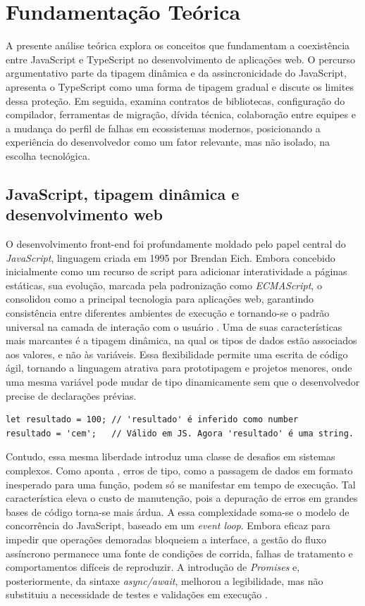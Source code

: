 \chapter{Fundamentação Teórica}
\label{chap:fundamentacao}

A presente análise teórica explora os conceitos que fundamentam a coexistência entre JavaScript e TypeScript no desenvolvimento de aplicações web. O percurso argumentativo parte da tipagem dinâmica e da assincronicidade do JavaScript, apresenta o TypeScript como uma forma de tipagem gradual e discute os limites dessa proteção. Em seguida, examina contratos de bibliotecas, configuração do compilador, ferramentas de migração, dívida técnica, colaboração entre equipes e a mudança do perfil de falhas em ecossistemas modernos, posicionando a experiência do desenvolvedor como um fator relevante, mas não isolado, na escolha tecnológica.

\section{JavaScript, tipagem dinâmica e desenvolvimento web}

O desenvolvimento front-end foi profundamente moldado pelo papel central do \textit{JavaScript}, linguagem criada em 1995 por Brendan Eich. Embora concebido inicialmente como um recurso de script para adicionar interatividade a páginas estáticas, sua evolução, marcada pela padronização como \textit{ECMAScript}, o consolidou como a principal tecnologia para aplicações web, garantindo consistência entre diferentes ambientes de execução e tornando-se o padrão universal na camada de interação com o usuário \cite{mororo2024}. Uma de suas características mais marcantes é a tipagem dinâmica, na qual os tipos de dados estão associados aos valores, e não às variáveis. Essa flexibilidade permite uma escrita de código ágil, tornando a linguagem atrativa para prototipagem e projetos menores, onde uma mesma variável pode mudar de tipo dinamicamente sem que o desenvolvedor precise de declarações prévias.

\begin{verbatim}
let resultado = 100; // 'resultado' é inferido como number
resultado = 'cem';   // Válido em JS. Agora 'resultado' é uma string.
\end{verbatim}

Contudo, essa mesma liberdade introduz uma classe de desafios em sistemas complexos. Como aponta \cite{makimov2022}, erros de tipo, como a passagem de dados em formato inesperado para uma função, podem só se manifestar em tempo de execução. Tal característica eleva o custo de manutenção, pois a depuração de erros em grandes bases de código torna-se mais árdua. A essa complexidade soma-se o modelo de concorrência do JavaScript, baseado em um \textit{event loop}. Embora eficaz para impedir que operações demoradas bloqueiem a interface, a gestão do fluxo assíncrono permanece uma fonte de condições de corrida, falhas de tratamento e comportamentos difíceis de reproduzir. A introdução de \textit{Promises} e, posteriormente, da sintaxe \textit{async/await}, melhorou a legibilidade, mas não substituiu a necessidade de testes e validações em execução \cite{mororo2024,tang2026ecosystem}.


